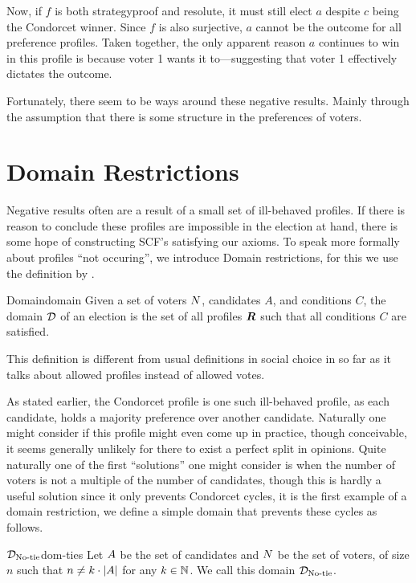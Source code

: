 Now, if $f$ is both strategyproof and resolute, it must still elect $a$ despite
$c$ being the Condorcet winner. Since $f$ is also surjective, $a$ cannot be the
outcome for all preference profiles. Taken together, the only apparent reason
$a$ continues to win in this profile is because voter 1 wants it to—suggesting
that voter 1 effectively dictates the outcome.

Fortunately, there seem to be ways around these negative results. Mainly
through the assumption that there is some structure in the preferences of
voters.

\section{Domain Restrictions} \label{sec:Domain-res}

Negative results often are a result of a small set of ill-behaved profiles. If there is
reason to conclude these profiles are impossible in the election at hand, there
is some hope of constructing SCF's satisfying our axioms. To speak more
formally about profiles ``not occuring'', we introduce Domain restrictions, for
this we use the definition by
\citet{elkindPreferenceRestrictionsComputational2022}.

\begin{definition}{Domain}{domain}
	{
		Given a set of voters $N$, candidates $A$, and conditions $C$, the domain $\mathcal{D}_{\textnormal{}}$ of an election is the set of all profiles $\boldsymbol{R}$ such that all conditions $C$ are satisfied.
	}
\end{definition}

This definition is different from usual definitions in social choice in so far as it talks about allowed profiles instead of allowed votes.

As stated earlier, the Condorcet profile is one such ill-behaved profile, as
each candidate, holds a majority preference over another candidate.
Naturally one might consider if this profile might even come up in practice,
though conceivable, it seems generally unlikely for there to exist a perfect
split in opinions. Quite naturally one of the first ``solutions'' one might
consider is when the number of voters is not a multiple of the number of
candidates, though this is hardly a useful solution since it only prevents
Condorcet cycles, it is the first example of a domain restriction, we define a
simple domain that prevents these cycles as follows.

\begin{definition}{$\mathcal{D}_{\textnormal{No-tie}}$}{dom-ties}
	Let $A$ be the set of candidates and $N$ be the set of voters, of size $n$ such that $n \neq k \cdot |A|$ for any $k \in \mathbb{N}$. We call this domain $\mathcal{D}_{\textnormal{No-tie}}$.
\end{definition}

